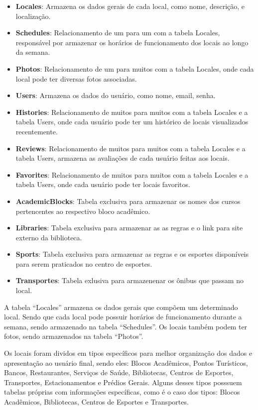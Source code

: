     \begin{itemize}
        \item \textbf{Locales}: Armazena os dados gerais de cada local, como nome, descrição, e localização.
        \item \textbf{Schedules}: Relacionamento de um para um com a tabela Locales, responsável por armazenar os horários de funcionamento dos locais ao longo da semana.
        \item \textbf{Photos}: Relacionamento de um para muitos com a tabela Locales, onde cada local pode ter diversas fotos associadas.
        \item \textbf{Users}: Armazena os dados do usuário, como nome, email, senha.
        \item \textbf{Histories}: Relacionamento de muitos para muitos com a tabela Locales e a tabela Users, onde cada usuário pode ter um histórico de locais visualizados recentemente.
        \item \textbf{Reviews}: Relacionamento de muitos para muitos com a tabela Locales e a tabela Users, armazena as avaliações de cada usuário feitas aos locais.
        \item \textbf{Favorites}: Relacionamento de muitos para muitos com a tabela Locales e a tabela Users, onde cada usuário pode ter locais favoritos.
        \item \textbf{AcademicBlocks}: Tabela exclusiva para armazenar os nomes dos cursos pertencentes ao respectivo bloco acadêmico.
        \item \textbf{Libraries}: Tabela exclusiva para armazenar as as regras e o link para site externo da biblioteca.
        \item \textbf{Sports}: Tabela exclusiva para armazenar as regras e os esportes disponíveis para serem praticados no centro de esportes.
        \item \textbf{Transportes}: Tabela exlusiva para armazenenar os ônibus que passam no local.
    \end{itemize}

    A tabela ``Locales'' armazena os dados gerais que compõem um determinado local. Sendo que cada local pode possuir horários de funcionamento durante a semana, sendo armazenado na tabela ``Schedules''. Os locais também podem ter fotos, sendo armazenados na tabela ``Photos''.
    
    Os locais foram dividos em tipos específicos para melhor organização dos dados e apresentação ao usuário final, sendo eles: Blocos Acadêmicos, Pontos Turísticos, Bancos, Restaurantes, Serviços de Saúde, Bibliotecas, Centros de Esportes, Transportes, Estacionamentos e Prédios Gerais. Alguns desses tipos posssuem tabelas próprias com informações específicas, como é o caso dos tipos: Blocos Acadêmicos, Bibliotecas, Centros de Esportes e Transportes. 
    

